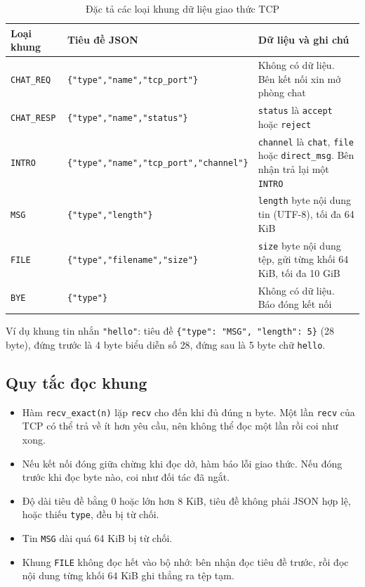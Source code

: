 \documentclass[a4paper,12pt]{article}
\newcommand{\code}[1]{\texttt{#1}}
\begin{document}
	\begin{table}[H]
		\centering
		\small
		\sloppy
		\renewcommand{\arraystretch}{1.35}
		\begin{tabularx}{\textwidth}{|>{\raggedright\arraybackslash}p{2.5cm}|>{\raggedright\arraybackslash}p{5.5cm}|X|}
			\hline
			\rowcolor{blue!12}
			\textcolor{blue!80!black}{\textbf{Loại khung}} & \textcolor{blue!80!black}{\textbf{Tiêu đề JSON}} & \textcolor{blue!80!black}{\textbf{Dữ liệu và ghi chú}} \\
			\hline
			\code{CHAT\_REQ} & \code{\{"type","name","tcp\_port"\}} & Không có dữ liệu. Bên kết nối xin mở phòng chat \\
			\hline
			\code{CHAT\_RESP} & \code{\{"type","name","status"\}} & \code{status} là \code{accept} hoặc \code{reject} \\
			\hline
			\code{INTRO} & \code{\{"type","name","tcp\_port",\allowbreak"channel"\}} & \code{channel} là \code{chat}, \code{file} hoặc \code{direct\_msg}. Bên nhận trả lại một \code{INTRO} \\
			\hline
			\code{MSG} & \code{\{"type","length"\}} & \code{length} byte nội dung tin (UTF-8), tối đa 64 KiB \\
			\hline
			\code{FILE} & \code{\{"type","filename","size"\}} & \code{size} byte nội dung tệp, gửi từng khối 64 KiB, tối đa 10 GiB \\
			\hline
			\code{BYE} & \code{\{"type"\}} & Không có dữ liệu. Báo đóng kết nối \\
			\hline
		\end{tabularx}
		\caption{Đặc tả các loại khung dữ liệu giao thức TCP}
		\label{tab:tcp_frames}
	\end{table}
	
	Ví dụ khung tin nhắn \code{"hello"}: tiêu đề \code{\{"type": "MSG", "length": 5\}} (28 byte), đứng trước là 4 byte biểu diễn số 28, đứng sau là 5 byte chữ \code{hello}.
	
	\subsection{Quy tắc đọc khung}
	\begin{itemize}
		\item Hàm \code{recv\_exact(n)} lặp \code{recv} cho đến khi đủ đúng n byte. Một lần \code{recv} của TCP có thể trả về ít hơn yêu cầu, nên không thể đọc một lần rồi coi như xong.
		\item Nếu kết nối đóng giữa chừng khi đọc dở, hàm báo lỗi giao thức. Nếu đóng trước khi đọc byte nào, coi như đối tác đã ngắt.
		\item Độ dài tiêu đề bằng 0 hoặc lớn hơn 8 KiB, tiêu đề không phải JSON hợp lệ, hoặc thiếu \code{type}, đều bị từ chối.
		\item Tin \code{MSG} dài quá 64 KiB bị từ chối.
		\item Khung \code{FILE} không đọc hết vào bộ nhớ: bên nhận đọc tiêu đề trước, rồi đọc nội dung từng khối 64 KiB ghi thẳng ra tệp tạm.
	\end{itemize}
	
\end{document}
